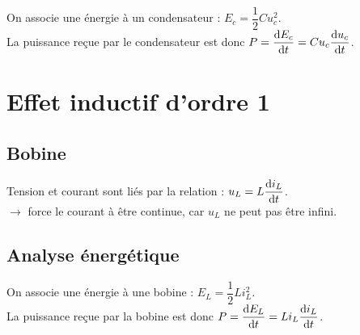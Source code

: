 \documentclass[13pt, twoside, a4paper, french]{report}
\begin{document}
                On associe une énergie à un condensateur : $E_c = \dfrac{1}{2} C u_c^2$.\\
                La puissance reçue par le condensateur est donc $P = \dfrac{\textrm d E_c}{\textrm d t} = C u_c \dfrac{\textrm d u_c}{\textrm d t}$.\\
        
        
        \section{Effet inductif d'ordre 1}\label{sec:effet-inductif-d'ordre-1}
            
            \subsection{Bobine}\label{subsec:bobine}
                
                Tension et courant sont liés par la relation : $u_L = L \dfrac{\textrm d i_L}{\textrm d t}$.\\
                $\rightarrow$ force le courant à être continue, car $u_L$ ne peut pas être infini.\\
            
            \subsection{Analyse énergétique}\label{subsec:analyse-energetique-2}
                
                On associe une énergie à une bobine : $E_L = \dfrac{1}{2} L i_L^2$.\\
                La puissance reçue par la bobine est donc $P = \dfrac{\textrm d E_L}{\textrm d t} = L i_L \dfrac{\textrm d i_L}{\textrm d t}$.\\
\end{document}
